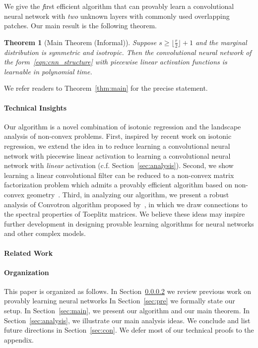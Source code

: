 \documentclass[11pt]{article}
\newtheorem{thm}{Theorem}[section]
\begin{document}
We give the {\emph first} efficient algorithm that can provably learn a convolutional neural network with \emph{two} unknown layers with commonly used overlapping patches. Our main result is the following theorem.
\begin{thm}[Main Theorem (Informal)]
	\label{thm:main_informal}
	Suppose $s \ge \lfloor \frac{r}{2} \rfloor + 1$ and the marginal distribution is symmetric and isotropic.  Then the convolutional neural network of the form~\eqref{eqn:cnn_structure} with piecewise linear activation functions is learnable in polynomial time.
\end{thm}
We refer readers to Theorem~\ref{thm:main} for the precise statement.  

\paragraph{Technical Insights}
Our algorithm is a novel combination of isotonic regression and the landscape analysis of non-convex problems.
First, inspired by recent work on isotonic regression, we extend the idea in \cite{goel2018learning} to reduce learning a convolutional neural network with piecewise linear activation to learning a convolutional neural network with \emph{linear} activation (c.f. Section~\ref{sec:analysis}).
Second, we show learning a linear convolutional filter can be reduced to a non-convex matrix factorization problem which admits a provably efficient algorithm based on non-convex geometry~\citep{ge2017no}.
Third, in analyzing our algorithm, we present a robust analysis of Convotron algorithm proposed by~\citet{goel2018learning}, in which we draw connections to the spectral properties of Toeplitz matrices.
We believe these ideas may inspire further development in designing provable learning algorithms for neural networks and other complex models.

\paragraph{Related Work}\label{sec:rel}\paragraph{Organization}
This paper is organized as follows.
In Section~\ref{sec:rel} we review previous work on provably learning neural networks 
In Section~\ref{sec:pre} we formally state our setup.
In Section~\ref{sec:main}, we present our algorithm and our main theorem.
In Section~\ref{sec:analysis}, we illustrate our main analysis ideas.
We conclude and list future directions in Section~\ref{sec:con}.
We defer most of our technical proofs to the appendix.
\end{document}
